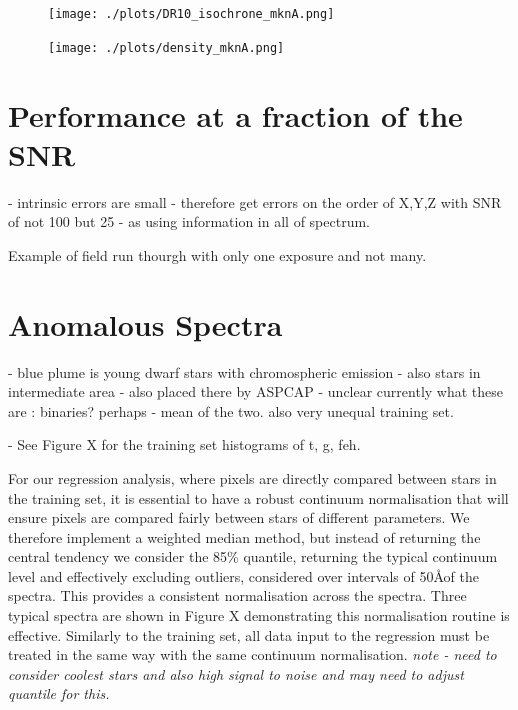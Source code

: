 \documentclass[12pt, preprint]{aastex}
\begin{document}
\begin{figure}[h!]
  \texttt{[image: ./plots/DR10\_isochrone\_mknA.png]}
\caption{\small{}}
\label{fig:cal}
\end{figure}

\begin{figure}[h!]
  \texttt{[image: ./plots/density\_mknA.png]}
\caption{\small{}}
\label{fig:cal}
\end{figure}


\section{Performance at a fraction of the SNR} 

- intrinsic errors are small 
- therefore get errors on the order of X,Y,Z with SNR of not 100 but 25 - as using information in all of spectrum. 

Example of field run thourgh with only one exposure and not many. 



\section{Anomalous Spectra}

- blue plume is young dwarf stars with chromospheric emission
- also stars in intermediate area - also placed there by ASPCAP - unclear currently what these are : binaries? perhaps - mean of the two. also very unequal training set. 

- See Figure X for the training set histograms of t, g, feh. 

For our regression analysis, where pixels are directly compared between stars in the training set, it is essential to have a robust continuum normalisation that will ensure pixels are compared fairly between stars of different parameters. We therefore implement a weighted median method, but instead of returning the central tendency we consider the 85\% quantile, returning the typical continuum level and effectively excluding outliers, considered over intervals of 50\AA of the spectra. This provides a consistent normalisation across the spectra. Three typical spectra are shown in Figure X demonstrating this normalisation routine is effective. Similarly to the training set, all data input to the regression must be treated in the same way with the same continuum normalisation.
\textit{ note - need to consider coolest stars and also high signal to noise and may need to adjust quantile for this. }
\end{document}
